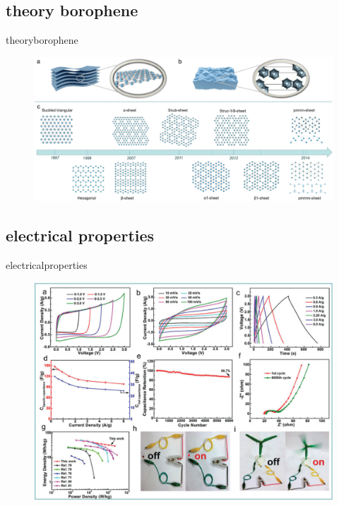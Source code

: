 \documentclass[handout,t]{beamer}
\begin{document}
\subsection{theory borophene}
\begin{frame}{theoryborophene}
	\begin{figure}
		\centering
		\includegraphics[width=\textwidth]{../figures/theory-borophene.png}
		\label{theoryborophene}
	\end{figure}
\end{frame}
\subsection{electrical properties}
\begin{frame}{electricalproperties}
	\begin{figure}
		\centering
		\includegraphics[width=0.5\linewidth]{../figures/electricalproperties.png}
		\label{fig:electricalproperties}
	\end{figure}
\end{frame}
\end{document}
